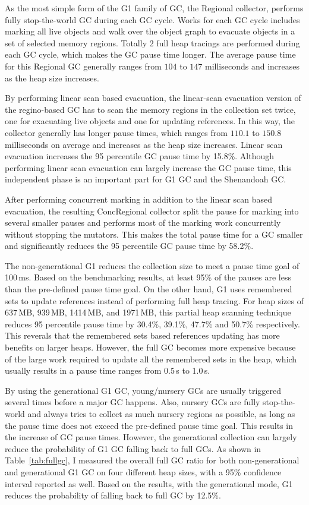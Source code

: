 As the most simple form of the G1 family of GC, the Regional collector, performs fully
stop-the-world GC during each GC cycle. Works for each GC cycle includes marking all
live objects and walk over the object graph to evacuate objects in a set of selected memory
regions. Totally 2 full heap tracings are performed during each GC cycle, which makes the GC
pause time longer. The average pause time for this Regional GC generally ranges from $104$ to $147$
milliseconds and increases as the heap size increases.

By performing linear scan based evacuation, the linear-scan evacuation version of the regino-based
GC has to scan the memory regions in the collection set twice, one for exacuating live objects and
one for updating references. In this way, the collector generally has longer pause times,
which ranges from $110.1$ to $150.8$ milliseconds on average and increases as the heap size increases.
Linear scan evacuation increases the 95 percentile GC pause time by 15.8\%.
Although performing linear scan evacuation can largely increase the GC pause time,
this independent phase is an important part for G1 GC and the Shenandoah GC.

After performing concurrent marking in addition to the linear scan based evacuation,
the resulting ConcRegional collector split the pause for marking into several smaller
pauses and performs most of the marking work concurrently without stopping the mutators.
This makes the total pause time for a GC smaller and significantly reduces the 95 percentile
GC pause time by 58.2\%.

The non-generational G1 reduces the collection size to meet a pause time goal of 100\,ms.
Based on the benchmarking results, at least 95\% of the pauses are less than the pre-defined
pause time goal. On the other hand, G1 uses remembered sets to update references
instead of performing full heap tracing.
For heap sizes of 637\,MB, 939\,MB, 1414\,MB, and 1971\,MB, this
partial heap scanning technique reduces 95 percentile pause time by 30.4\%, 39.1\%, 47.7\% and 50.7\%
respectively. This reverals that the remembered sets based references updating has more benefits on
larger heaps. However, the full GC becomes more expensive because of the large work required
to update all the remembered sets in the heap, which usually results in a pause time
ranges from 0.5\,s to 1.0\,s.

By using the generational G1 GC, young/nursery GCs are usually triggered several times
before a major GC happens. Also, nursery GCs are fully stop-the-world and always tries
to collect as much nursery regions as possible, as long as the pause time does not exceed
the pre-defined pause time goal. This results in the increase of GC pause times.
However, the generational collection can largely reduce the probability of G1 GC falling
back to full GCs. As shown in Table~\ref{tab:fullgc}, I measured the overall full GC ratio
for both non-generational and generational G1 GC on four different heap sizes,
with a 95\% confidence interval reported as well.
Based on the results, with the generational mode, G1 reduces the
probability of falling back to full GC by 12.5\%.

